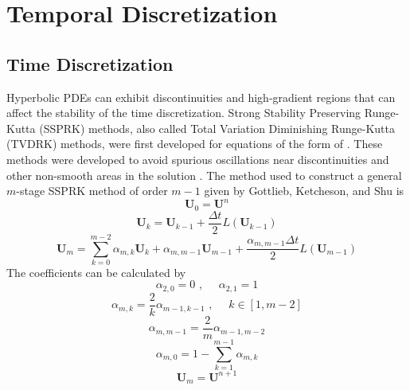 \chapter{Temporal Discretization}

\section{Time Discretization}

Hyperbolic PDEs can exhibit discontinuities and high-gradient regions that can affect the stability of the time discretization. Strong Stability Preserving Runge-Kutta (SSPRK) methods, also called Total Variation Diminishing Runge-Kutta (TVDRK) methods, were first developed for equations of the form of  \cite{GottliebandGottlieb}. These methods were developed to avoid spurious oscillations near discontinuities and other non-smooth areas in the solution \cite{hadjimichael}.  The method used to construct a general $m$-stage SSPRK method of order $m-1$ given by Gottlieb, Ketcheson, and Shu \cite{Gottlieb2009} is
\begin{equation}
	\boldsymbol{U}_0 = \boldsymbol{U}^n
\end{equation}
\begin{equation}
	\boldsymbol{U}_k = \boldsymbol{U}_{k-1} + \frac{\Delta t}{2} L\left(\boldsymbol{U}_{k-1}\right)
\end{equation}
\begin{equation}
	\boldsymbol{U}_m = \sum_{k=0}^{m-2} \alpha_{m,k} \boldsymbol{U}_k + \alpha_{m,m-1} \boldsymbol{U}_{m-1} + \frac{\alpha_{m,m-1} \Delta t}{2} L\left(\boldsymbol{U}_{m-1}\right)
\end{equation}
The coefficients can be calculated by
\begin{equation}
	\alpha_{2,0} = 0 \,\, , \,\,\,\,\,\,\,\, \alpha_{2,1} = 1
\end{equation}
\begin{equation}
	\alpha_{m,k} = \frac{2}{k} \alpha_{m-1,k-1} \,\, , \,\,\,\,\,\,\,\, k \in \left[1,m-2\right]
\end{equation}
\begin{equation}
	\alpha_{m,m-1} = \frac{2}{m} \alpha_{m-1,m-2}
\end{equation}
\begin{equation}
	\alpha_{m,0} = 1 - \sum_{k=1}^{m-1} \alpha_{m,k}
\end{equation}
\begin{equation}
	\boldsymbol{U}_m = \boldsymbol{U}^{n+1}
\end{equation}

